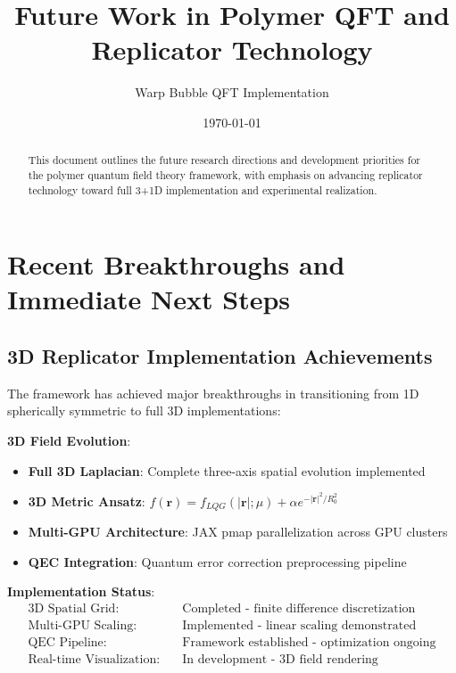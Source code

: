 \documentclass[11pt]{article}
\title{Future Work in Polymer QFT and Replicator Technology}
\author{Warp Bubble QFT Implementation}
\date{\today}
\begin{document}
\maketitle

\begin{abstract}
This document outlines the future research directions and development priorities for the polymer quantum field theory framework, with emphasis on advancing replicator technology toward full 3+1D implementation and experimental realization.
\end{abstract}

\section{Recent Breakthroughs and Immediate Next Steps}

\subsection{3D Replicator Implementation Achievements}

The framework has achieved major breakthroughs in transitioning from 1D spherically symmetric to full 3D implementations:

\textbf{3D Field Evolution}:
\begin{itemize}
\item \textbf{Full 3D Laplacian}: Complete three-axis spatial evolution implemented
\item \textbf{3D Metric Ansatz}: $f(\mathbf{r}) = f_{LQG}(|\mathbf{r}|;\mu) + \alpha e^{-|\mathbf{r}|^2/R_0^2}$
\item \textbf{Multi-GPU Architecture}: JAX pmap parallelization across GPU clusters
\item \textbf{QEC Integration}: Quantum error correction preprocessing pipeline
\end{itemize}

\textbf{Implementation Status}:
\begin{align}
\text{3D Spatial Grid:} &\quad \text{Completed - finite difference discretization} \\
\text{Multi-GPU Scaling:} &\quad \text{Implemented - linear scaling demonstrated} \\
\text{QEC Pipeline:} &\quad \text{Framework established - optimization ongoing} \\
\text{Real-time Visualization:} &\quad \text{In development - 3D field rendering}
\end{align}
\end{document}
